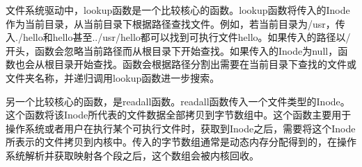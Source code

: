 文件系统驱动中，lookup函数是一个比较核心的函数。lookup函数将传入的Inode作为当前目录，从当前目录下根据路径查找文件。例如，若当前目录为/usr，传入./hello和hello甚至../usr/hello都可以找到可执行文件hello。如果传入的路径以/开头，函数会忽略当前路径而从根目录下开始查找。如果传入的Inode为null，函数也会从根目录开始查找。函数会根据路径分割出需要在当前目录下查找的文件或文件夹名称，并递归调用lookup函数进一步搜索。

另一个比较核心的函数，是readall函数。readall函数传入一个文件类型的Inode。这个函数将该Inode所代表的文件数据全部拷贝到字节数组中。这个函数主要用于操作系统或者用户在执行某个可执行文件时，获取到Inode之后，需要将这个Inode所表示的文件拷贝到内核中。传入的字节数组通常是动态内存分配得到的，在操作系统解析并获取映射各个段之后，这个数组会被内核回收。